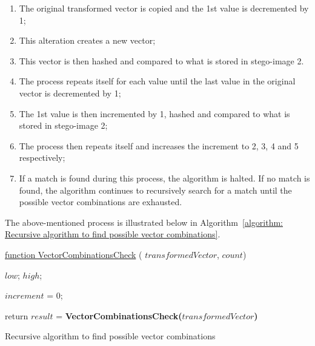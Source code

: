 \begin{enumerate}[label=\roman*.]
    \item The original transformed vector is copied and the 1st value is decremented by 1;
    \item This alteration creates a new vector;
    \item This vector is then hashed and compared to what is stored in stego-image 2.
    \item The process repeats itself for each value until the last value in the original vector is decremented by 1;
    \item The 1st value is then incremented by 1, hashed and compared to what is stored in stego-image 2;
    \item The process then repeats itself and increases the increment to 2, 3, 4 and 5 respectively;
    \item If a match is found during this process, the algorithm is halted. If no match is found, the algorithm continues to recursively search for a match until the possible vector combinations are exhausted.
\end{enumerate}

The above-mentioned process is illustrated below in Algorithm~\ref{algorithm: Recursive algorithm to find possible vector combinations}.

\begin{algorithm}
     
     \underline{function VectorCombinationsCheck} ( $transformedVector$, $count$)\;
     
      $low$;
      $high$;
     
     $increment$ = 0;
     
     
     
     return $result$ = \textbf{VectorCombinationsCheck($transformedVector$)}
     
     \label{algorithm: Recursive algorithm to find possible vector combinations}
     \caption{Recursive algorithm to find possible vector combinations}
\end{algorithm}


